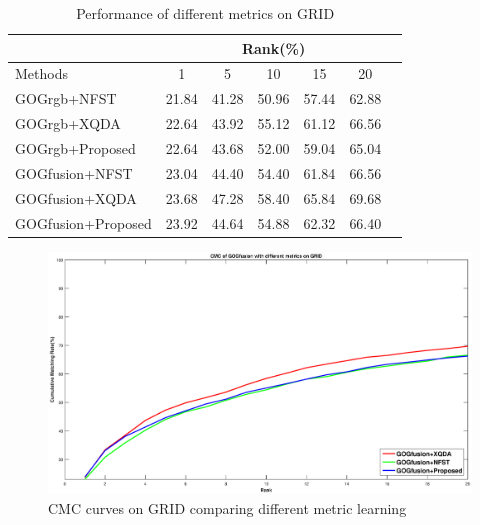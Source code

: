 \documentclass[conference,compsoc]{IEEEtran}
\begin{document}
\begin{table}[H]
\caption{Performance of different metrics on GRID}
\centering
\begin{tabular}{|l|c|c|c|c|c|c|}
\hline
& \multicolumn{5}{|c|}{Rank(\%)} \\
\hline
Methods& 1 & 5 &10& 15&20\\
\hline
GOGrgb+NFST& 21.84&41.28 &50.96& 57.44&62.88 \\ 
\hline
GOGrgb+XQDA& 22.64&43.92 &55.12 &61.12&66.56\\ 
\hline
GOGrgb+Proposed&22.64&43.68&52.00&59.04&65.04\\  %
\hline
GOGfusion+NFST& 23.04&44.40 &54.40 &61.84&66.56\\ 
\hline
GOGfusion+XQDA& 23.68&47.28 &58.40 &65.84&69.68 \\ 
\hline
GOGfusion+Proposed&23.92&44.64&54.88&62.32&66.40\\ %

\hline

\end{tabular}
\end{table}

\begin{figure}
\begin{raggedleft}
\includegraphics[width=1\linewidth]{GRID.eps}
\vspace{-3em}
\caption{CMC curves on GRID comparing different metric learning}
\end{raggedleft}
\end{figure}
\end{document}
